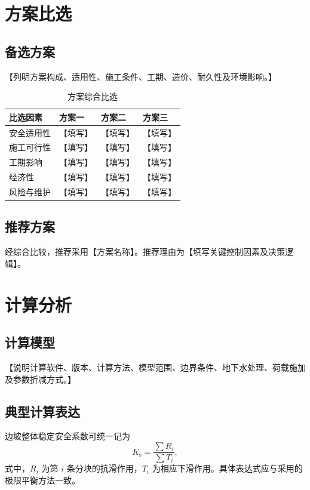 \documentclass[UTF8,zihao=-4,oneside]{ctexrep}
\newcommand{\placeholder}[1]{\textcolor{documentblack}{【#1】}}
\newcommand{\safetyfactor}{K_{\mathrm{s}}}
\begin{document}
\chapter{方案比选}

\section{备选方案}
\placeholder{列明方案构成、适用性、施工条件、工期、造价、耐久性及环境影响。}

\begin{table}[H]
  \centering
  \caption{方案综合比选}
  \label{tab:comparison}
  \begin{tabularx}{\textwidth}{p{27mm}XXX}
    \toprule
    比选因素 & 方案一 & 方案二 & 方案三 \\
    \midrule
    安全适用性 & \placeholder{填写} & \placeholder{填写} & \placeholder{填写} \\
    施工可行性 & \placeholder{填写} & \placeholder{填写} & \placeholder{填写} \\
    工期影响 & \placeholder{填写} & \placeholder{填写} & \placeholder{填写} \\
    经济性 & \placeholder{填写} & \placeholder{填写} & \placeholder{填写} \\
    风险与维护 & \placeholder{填写} & \placeholder{填写} & \placeholder{填写} \\
    \bottomrule
  \end{tabularx}
\end{table}

\section{推荐方案}
经综合比较，推荐采用\placeholder{方案名称}。推荐理由为\placeholder{填写关键控制因素及决策逻辑}。

\chapter{计算分析}

\section{计算模型}
\placeholder{说明计算软件、版本、计算方法、模型范围、边界条件、地下水处理、荷载施加及参数折减方式。}

\section{典型计算表达}
边坡整体稳定安全系数可统一记为
\begin{equation}
  \safetyfactor=\frac{\sum R_i}{\sum T_i},
  \label{eq:ks}
\end{equation}
式中，$R_i$ 为第 $i$ 条分块的抗滑作用，$T_i$ 为相应下滑作用。具体表达式应与采用的极限平衡方法一致。
\end{document}
